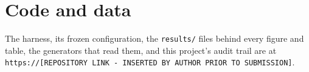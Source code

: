 \documentclass{article}
\begin{document}
%
\makeatletter
\if@anonymous\else
\section*{Code and data}
The harness, its frozen configuration, the \texttt{results/} files behind every figure and
table, the generators that read them, and this project's audit trail are at
\texttt{https://[REPOSITORY LINK - INSERTED BY AUTHOR PRIOR TO SUBMISSION]}.
\fi
\makeatother
\end{document}

